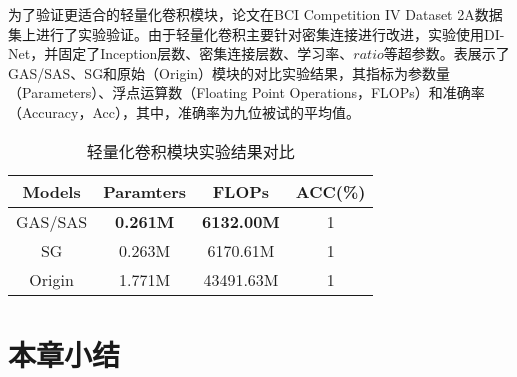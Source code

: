 为了验证更适合的轻量化卷积模块，论文在BCI Competition IV Dataset 2A数据集上进行了实验验证。由于轻量化卷积主要针对密集连接进行改进，实验使用DI-Net，并固定了Inception层数、密集连接层数、学习率、\(ratio\)等超参数。表展示了GAS/SAS、SG和原始（Origin）模块的对比实验结果，其指标为参数量（Parameters）、浮点运算数（Floating Point Operations，FLOPs）和准确率（Accuracy，Acc），其中，准确率为九位被试的平均值。
\begin{table}[ht]
    \centering
    \caption{轻量化卷积模块实验结果对比}
    \label{tab:lite}
    \begin{tabularx}{\textwidth}{CCCC}
      \toprule
      Models & Paramters & FLOPs & ACC(\%) \\
      \midrule
      GAS/SAS & \textbf{0.261M} & \textbf{6132.00M} & 1\\
      SG & 0.263M & 6170.61M & 1\\
      Origin & 1.771M & 43491.63M & 1\\
      \bottomrule
    \end{tabularx}
  \end{table}

\section{本章小结}
